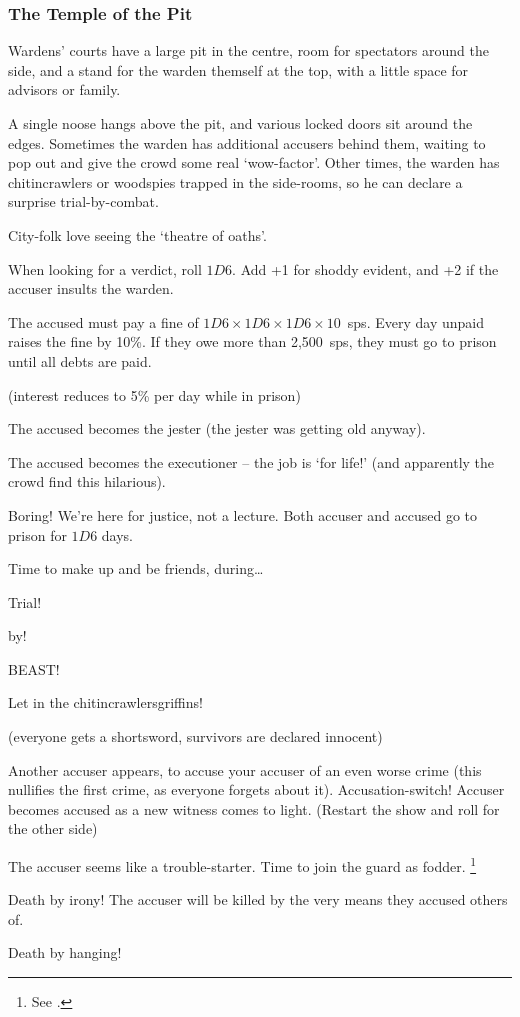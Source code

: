 \begin{multicols}{2}
\subsubsection{The Temple of the Pit}

Wardens' courts have a large pit in the centre, room for spectators around the side, and a stand for the warden themself at the top, with a little space for advisors or family.

A single noose hangs above the pit, and various locked doors sit around the edges.
Sometimes the warden has additional accusers behind them, waiting to pop out and give the crowd some real `wow-factor'.
Other times, the warden has chitincrawlers or woodspies trapped in the side-rooms, so he can declare a surprise trial-by-combat.

City-folk love seeing the `theatre of oaths'.

When looking for a verdict, roll $1D6$.
Add +1 for shoddy evident, and +2 if the accuser insults the warden.

\begin{dlist}
  \item
  The accused must pay a fine of $1D6\times 1D6\times 1D6\times 10$~\glspl{sp}.
  Every day unpaid raises the fine by 10\%.
  If they owe more than 2,500~\glspl{sp}, they must go to prison until all debts are paid.

  (interest reduces to 5\% per day while in prison)
  \item
  The accused becomes the jester (the jester was getting old anyway).
  \item
  The accused becomes the executioner -- the job is `for life!' (and apparently the crowd find this hilarious).
  \item
  Boring!
  We're here for justice, not a lecture.
  Both accuser and accused go to prison for $1D6$ days.
  \item
  Time to make up and be friends, during\ldots

  Trial!

  by!

  BEAST!

  Let in the \ifodd\value{r4} chitincrawlers\else griffins\fi!

  (everyone gets a shortsword, survivors are declared innocent)
  \item
  \ifodd\value{r3}
    Another accuser appears, to accuse your accuser of an even worse crime (this nullifies the first crime, as everyone forgets about it).
  \else
    Accusation-switch!
    Accuser becomes accused as a new witness comes to light.
    (Restart the show and roll for the other side)
  \fi
  \item
  The accuser seems like a trouble-starter.
  Time to join the \gls{guard} as fodder.%
  \footnote{See .}
  \item
  Death by irony!
  The accuser will be killed by the very means they accused others of.
  \item
  Death by hanging!


\end{dlist}
\end{multicols}
